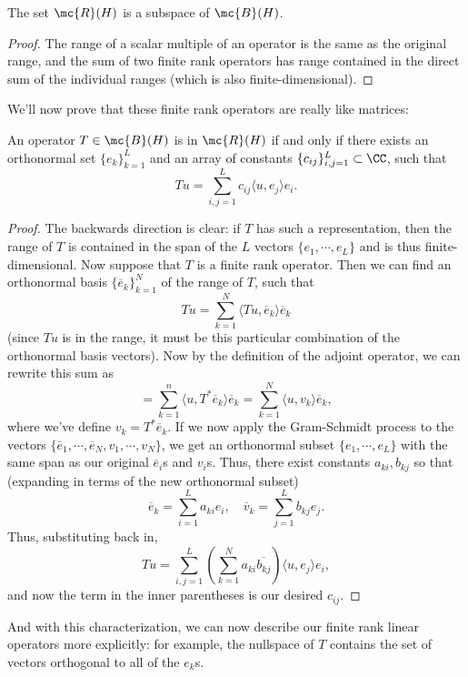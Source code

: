 \begin{proposition}
The set $\mc{R}(H)$ is a subspace of $\mc{B}(H)$.
\end{proposition}
\begin{proof}
The range of a scalar multiple of an operator is the same as the original range, and the sum of two finite rank operators has range contained in the direct sum of the individual ranges (which is also finite-dimensional).
\end{proof}

We'll now prove that these finite rank operators are really like matrices:

\begin{theorem}
An operator $T \in \mc{B}(H)$ is in $\mc{R}(H)$ if and only if there exists an orthonormal set $\{e_k\}_{k=1}^{L}$ and an array of constants $\{c_{ij}\}_{i,j=1}^L \subset \CC$, such that 
\[
    Tu = \sum_{i,j=1}^{L} c_{ij} \langle u, e_j \rangle e_i.
\]
\end{theorem}
\begin{proof}
The backwards direction is clear: if $T$ has such a representation, then the range of $T$ is contained in the span of the $L$ vectors $\{e_1, \cdots, e_L\}$ and is thus finite-dimensional. Now suppose that $T$ is a finite rank operator. Then we can find an orthonormal basis $\{\overline{e}_k\}_{k=1}^N$ of the range of $T$, such that
\[
    Tu = \sum_{k=1}^{N} \langle Tu, \overline{e}_k \rangle \overline{e}_k
\]
(since $Tu$ is in the range, it must be this particular combination of the orthonormal basis vectors). Now by the definition of the adjoint operator, we can rewrite this sum as 
\[
    = \sum_{k=1}^n \langle u, T^\ast \overline{e}_k \rangle \overline{e}_k = \sum_{k=1}^N \langle u, v_k \rangle \overline{e}_k,
\]
where we've define $v_k = T^\ast \overline{e}_k$. If we now apply the Gram-Schmidt process to the vectors $\{\overline{e}_1, \cdots, \overline{e}_N, v_1, \cdots, v_N\}$, we get an orthonormal subset $\{e_1, \cdots, e_L\}$ with the same span as our original $\overline{e}_i$s and $v_i$s. Thus, there exist constants $a_{ki}, b_{kj}$ so that (expanding in terms of the new orthonormal subset)
\[
    \overline{e}_k = \sum_{i=1}^{L} a_{ki} e_i, \quad \overline{v}_k = \sum_{j=1}^L b_{kj} e_j. 
\]
Thus, substituting back in, 
\[
    Tu = \sum_{i,j=1}^{L} \left(\sum_{k=1}^N a_{ki} \overline{b_{kj}} \right) \langle u, e_j \rangle e_i,
\]
and now the term in the inner parentheses is our desired $c_{ij}$. 
\end{proof}

And with this characterization, we can now describe our finite rank linear operators more explicitly: for example, the nullspace of $T$ contains the set of vectors orthogonal to all of the $e_k$s.

